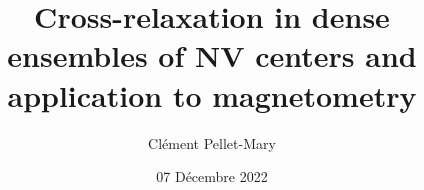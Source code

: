 \documentclass[a4paper, 11pt]{book}
\title{Cross-relaxation in dense ensembles of NV centers and application to magnetometry}
\author{Clément Pellet-Mary}
\institute{ENS Paris}
\date{07 Décembre 2022}
\begin{document}
\maketitle{}
\end{document}
